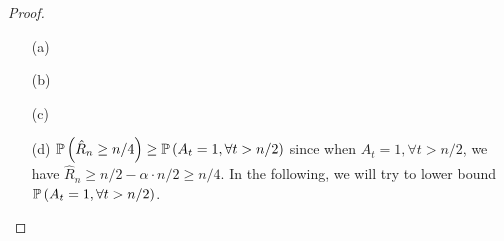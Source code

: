 \begin{proof}
\begin{enumerate}
    \item[(a)]
    \item[(b)]
    \item[(c)]
    \item[(d)]
    $\mathbb{P} \left(\hat{R}_n\ge n/4\right)\ge \mathbb{P} \left(A_t=1,\forall t>n/2\right)$ since when $A_t=1,\forall t>n/2$, we have $\hat{R}_n\ge n/2-\alpha\cdot n/2 \ge n/4$. In the following, we will try to lower bound $\mathbb{P} \left(A_t=1,\forall t>n/2\right)$. 
    
    
\end{enumerate}
\end{proof}

